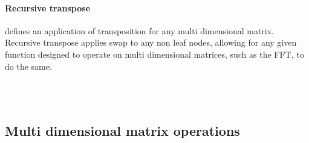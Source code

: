\paragraph{Recursive transpose} defines an application of transposition for any 
multi dimensional matrix.
Recursive transpose applies swap to any non leaf nodes, allowing for any given 
function designed to operate on multi dimensional matrices, such as the FFT, to
do the same.
\begin{code}%
%
\>[2]\AgdaSpace{}%
\AgdaSymbol{:}\AgdaSpace{}%
\AgdaSpace{}%
\AgdaSpace{}%
\<%
\\
%
\>[2]\AgdaSpace{}%
\AgdaSymbol{(}\AgdaSpace{}%
%
\>[29]\AgdaSymbol{)}\AgdaSpace{}%
\AgdaSymbol{=}\AgdaSpace{}%
\AgdaSpace{}%
\<%
\\
%
\>[2]\AgdaSpace{}%
\AgdaSymbol{(}\AgdaSpace{}%
\AgdaSpace{}%
\AgdaSymbol{)}\AgdaSpace{}%
\AgdaSymbol{=}\AgdaSpace{}%
\AgdaSpace{}%
\AgdaSpace{}%
\AgdaSpace{}%
\AgdaSpace{}%
\<%
\end{code}


\subsection{Multi dimensional matrix operations} 
